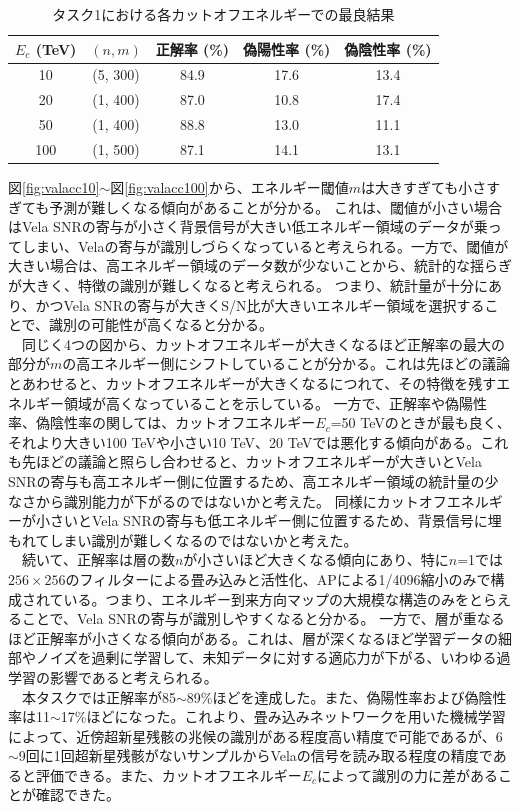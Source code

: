 \documentclass[a4paper,11truept]{ltjsreport}
\begin{document}
\begin{table}[H]
  \centering
  \caption{タスク1における各カットオフエネルギーでの最良結果}
  \label{tab:task1_results}
  \begin{tabular}{|c|c|c|c|c|}
    \hline
    $E_c$ (TeV) & $(n, m)$  & 正解率 (\%) & 偽陽性率 (\%) & 偽陰性率 (\%) \\
    \hline
    10 & (5, 300) & 84.9 & 17.6 & 13.4 \\
    \hline
    20 & (1, 400) & 87.0 & 10.8 & 17.4 \\
    \hline
    50 & (1, 400)  & 88.8 & 13.0 & 11.1 \\
    \hline
    100 & (1, 500)  & 87.1 & 14.1 & 13.1 \\
    \hline
  \end{tabular}
\end{table}
図\ref{fig:valacc10}$\sim$図\ref{fig:valacc100}から、エネルギー閾値$m$は大きすぎても小さすぎても予測が難しくなる傾向があることが分かる。
これは、閾値が小さい場合はVela SNRの寄与が小さく背景信号が大きい低エネルギー領域のデータが乗ってしまい、Velaの寄与が識別しづらくなっていると考えられる。一方で、閾値が大きい場合は、高エネルギー領域のデータ数が少ないことから、統計的な揺らぎが大きく、特徴の識別が難しくなると考えられる。
つまり、統計量が十分にあり、かつVela SNRの寄与が大きくS/N比が大きいエネルギー領域を選択することで、識別の可能性が高くなると分かる。\\
　同じく4つの図から、カットオフエネルギーが大きくなるほど正解率の最大の部分が$m$の高エネルギー側にシフトしていることが分かる。これは先ほどの議論とあわせると、カットオフエネルギーが大きくなるにつれて、その特徴を残すエネルギー領域が高くなっていることを示している。
一方で、正解率や偽陽性率、偽陰性率の関しては、カットオフエネルギー$E_c$=50 TeVのときが最も良く、それより大きい100 TeVや小さい10 TeV、20 TeVでは悪化する傾向がある。これも先ほどの議論と照らし合わせると、カットオフエネルギーが大きいとVela SNRの寄与も高エネルギー側に位置するため、高エネルギー領域の統計量の少なさから識別能力が下がるのではないかと考えた。
同様にカットオフエネルギーが小さいとVela SNRの寄与も低エネルギー側に位置するため、背景信号に埋もれてしまい識別が難しくなるのではないかと考えた。\\
　続いて、正解率は層の数$n$が小さいほど大きくなる傾向にあり、特に$n$=1では$256\times256$のフィルターによる畳み込みと活性化、APによる1/4096縮小のみで構成されている。つまり、エネルギー到来方向マップの大規模な構造のみをとらえることで、Vela SNRの寄与が識別しやすくなると分かる。
一方で、層が重なるほど正解率が小さくなる傾向がある。これは、層が深くなるほど学習データの細部やノイズを過剰に学習して、未知データに対する適応力が下がる、いわゆる過学習の影響であると考えられる。\\
　本タスクでは正解率が85$\sim$89\%ほどを達成した。また、偽陽性率および偽陰性率は11$\sim$17\%ほどになった。これより、畳み込みネットワークを用いた機械学習によって、近傍超新星残骸の兆候の識別がある程度高い精度で可能であるが、6$\sim$9回に1回超新星残骸がないサンプルからVelaの信号を読み取る程度の精度であると評価できる。また、カットオフエネルギー$E_c$によって識別の力に差があることが確認できた。
\end{document}
